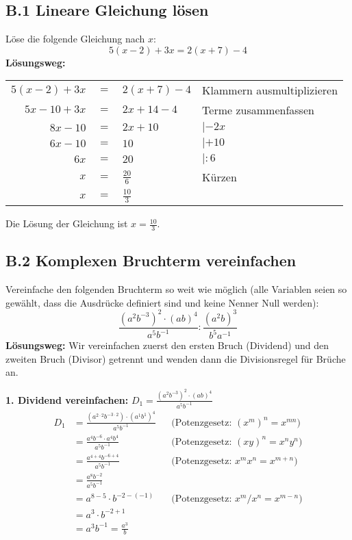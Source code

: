 \subsection*{B.1 Lineare Gleichung lösen}
Löse die folgende Gleichung nach $x$:
\[ 5(x-2) + 3x = 2(x+7) - 4 \]
\textbf{Lösungsweg:}
\begin{center}
\begin{tabular}{r @{\,} c @{\,} l @{\quad\quad} l}
$5(x-2) + 3x$ & $=$ & $2(x+7) - 4$ & \small{Klammern ausmultiplizieren} \\
$5x - 10 + 3x$ & $=$ & $2x + 14 - 4$ & \small{Terme zusammenfassen} \\
$8x - 10$ & $=$ & $2x + 10$ & $| -2x$ \\
$6x - 10$ & $=$ & $10$ & $| +10$ \\
$6x$ & $=$ & $20$ & $| :6$ \\
$x$ & $=$ & $\frac{20}{6}$ & \small{Kürzen} \\
$x$ & $=$ & $\frac{10}{3}$ & \\
\end{tabular}
\end{center}
Die Lösung der Gleichung ist $x = \frac{10}{3}$.

\subsection*{B.2 Komplexen Bruchterm vereinfachen}
Vereinfache den folgenden Bruchterm so weit wie möglich (alle Variablen seien so gewählt, dass die Ausdrücke definiert sind und keine Nenner Null werden):
\[ \frac{(a^2b^{-3})^2 \cdot (ab)^4}{a^5 b^{-1}} : \frac{(a^2b)^3}{b^5 a^{-1}} \]
\textbf{Lösungsweg:}
Wir vereinfachen zuerst den ersten Bruch (Dividend) und den zweiten Bruch (Divisor) getrennt und wenden dann die Divisionsregel für Brüche an.

\textbf{1. Dividend vereinfachen:} $D_1 = \frac{(a^2b^{-3})^2 \cdot (ab)^4}{a^5 b^{-1}}$
\begin{align*} D_1 &= \frac{(a^{2\cdot2}b^{-3\cdot2}) \cdot (a^1b^1)^4}{a^5 b^{-1}} && \text{(Potenzgesetz: $(x^m)^n = x^{mn}$)} \\ &= \frac{a^4 b^{-6} \cdot a^4 b^4}{a^5 b^{-1}} && \text{(Potenzgesetz: $(xy)^n = x^n y^n$)} \\ &= \frac{a^{4+4} b^{-6+4}}{a^5 b^{-1}} && \text{(Potenzgesetz: $x^m x^n = x^{m+n}$)} \\ &= \frac{a^8 b^{-2}}{a^5 b^{-1}} \\ &= a^{8-5} \cdot b^{-2-(-1)} && \text{(Potenzgesetz: $x^m/x^n = x^{m-n}$)} \\ &= a^3 \cdot b^{-2+1} \\ &= a^3 b^{-1} = \frac{a^3}{b} \end{align*}

